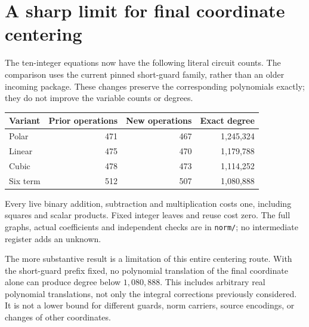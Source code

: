\documentclass[11pt]{article}
\begin{document}
\section{A sharp limit for final coordinate centering}
The ten-integer equations now have the following literal circuit counts.
The comparison uses the current pinned short-guard family, rather than an
older incoming package. These changes preserve the corresponding
polynomials exactly; they do not improve the variable counts or degrees.
\begin{center}
\begin{tabular}{lrrr}
Variant & Prior operations & New operations & Exact degree\\\hline
Polar &471&467&1,245,324\\
Linear &475&470&1,179,788\\
Cubic &478&473&1,114,252\\
Six term &512&507&1,080,888
\end{tabular}
\end{center}
Every live binary addition, subtraction and multiplication costs one,
including squares and scalar products. Fixed integer leaves and reuse cost
zero. The full graphs, actual coefficients and independent checks are in
\texttt{norm/}; no intermediate register adds an unknown.

The more substantive result is a limitation of this entire centering route.
With the short-guard prefix fixed, no polynomial translation of the final
coordinate alone can produce degree below $1{,}080{,}888$. This includes
arbitrary real polynomial translations, not only the integral corrections
previously considered. It is not a lower bound for different guards, norm
carriers, source encodings, or changes of other coordinates.
\end{document}
